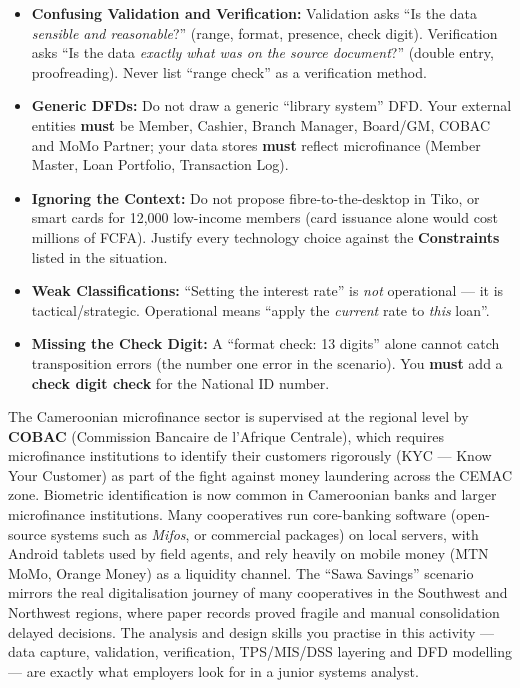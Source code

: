 \documentclass[11pt]{article}
\newcommand{\cle}[1]{{\popxbold\color{popdark}#1}}
\begin{document}
\begin{attention}
\begin{itemize}
    \item \textbf{Confusing Validation and Verification:} Validation asks ``Is the data \emph{sensible and reasonable}?'' (range, format, presence, check digit). Verification asks ``Is the data \emph{exactly what was on the source document}?'' (double entry, proofreading). Never list ``range check'' as a verification method.
    \item \textbf{Generic DFDs:} Do not draw a generic ``library system'' DFD. Your external entities \textbf{must} be Member, Cashier, Branch Manager, Board/GM, COBAC and MoMo Partner; your data stores \textbf{must} reflect microfinance (Member Master, Loan Portfolio, Transaction Log).
    \item \textbf{Ignoring the Context:} Do not propose fibre-to-the-desktop in Tiko, or smart cards for 12,000 low-income members (card issuance alone would cost millions of FCFA). Justify every technology choice against the \textbf{Constraints} listed in the situation.
    \item \textbf{Weak Classifications:} ``Setting the interest rate'' is \emph{not} operational --- it is tactical/strategic. Operational means ``apply the \emph{current} rate to \emph{this} loan''.
    \item \textbf{Missing the Check Digit:} A ``format check: 13 digits'' alone cannot catch transposition errors (the number one error in the scenario). You \textbf{must} add a \textbf{check digit check} for the National ID number.
\end{itemize}
\end{attention}

\begin{savaistu}
The Cameroonian microfinance sector is supervised at the regional level by \textbf{COBAC} (Commission Bancaire de l'Afrique Centrale), which requires microfinance institutions to identify their customers rigorously (\cle{KYC} --- Know Your Customer) as part of the fight against money laundering across the CEMAC zone. Biometric identification is now common in Cameroonian banks and larger microfinance institutions. Many cooperatives run core-banking software (open-source systems such as \textit{Mifos}, or commercial packages) on local servers, with Android tablets used by field agents, and rely heavily on mobile money (MTN MoMo, Orange Money) as a liquidity channel. The ``Sawa Savings'' scenario mirrors the real digitalisation journey of many cooperatives in the Southwest and Northwest regions, where paper records proved fragile and manual consolidation delayed decisions. The analysis and design skills you practise in this activity --- data capture, validation, verification, TPS/MIS/DSS layering and DFD modelling --- are exactly what employers look for in a junior systems analyst.
\end{savaistu}
\end{document}
